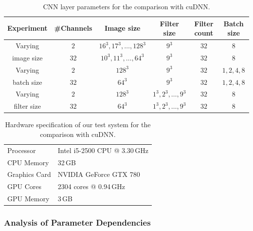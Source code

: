 \begin{table}
\centering
\caption{CNN layer parameters for the comparison with cuDNN.}
\label{tab:cudnn_parameters}
\begin{tabular}{cccccc}
\toprule
Experiment & \#Channels & Image size & Filter size & Filter count & Batch size
\\
\midrule
Varying & $2$  & $16^3, 17^3, \dotsc, 128^3$ & $9^3$ & $32$ & $8$ \\
image size & $32$ & $10^3, 11^3, \dotsc, 64^3$  & $9^3$ & $32$ & $8$ \\
\addlinespace
Varying & $2$  & $128^3$ & $9^3$ & $32$ & $1, 2, 4, 8$ \\
batch size & $32$ & $64^3$  & $9^3$ & $32$ & $1, 2, 4, 8$ \\
\addlinespace
Varying & $2$  & $128^3$ & $1^3, 2^3, \dotsc, 9^3$ & $32$ & $8$ \\
filter size & $32$ & $64^3$  & $1^3, 2^3, \dotsc, 9^3$ & $32$ & $8$ \\
\bottomrule
\end{tabular}
\end{table} 

\begin{table} 
\centering
\caption{Hardware specification of our test system for the comparison with
cuDNN.}
\label{tab:cudnn_hardware}
\begin{tabular} {ll}
\toprule
Processor & Intel i5-2500 CPU @ 3.30\,GHz \\
CPU Memory & 32\,GB \\
\addlinespace
Graphics Card & NVIDIA GeForce GTX 780 \\
GPU Cores & 2304 cores @ 0.94\,GHz \\
GPU Memory & 3\,GB \\
\bottomrule
\end{tabular}
\end{table}

\subsubsection{Analysis of Parameter Dependencies}

